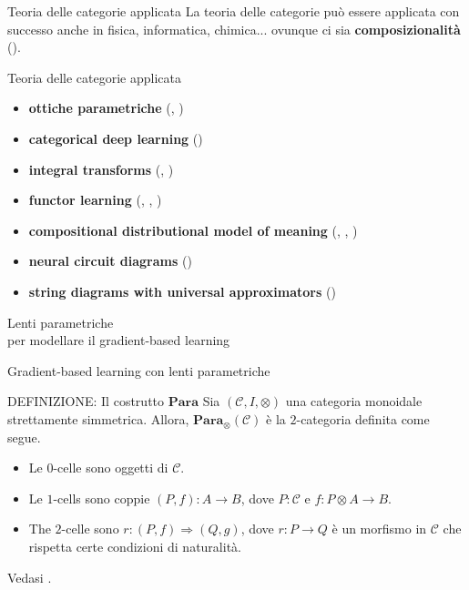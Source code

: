 \documentclass{beamer}
\begin{document}
\begin{frame}{Teoria delle categorie applicata}
    \centering La teoria delle categorie può essere applicata con successo anche in fisica, informatica, chimica... ovunque ci sia \textbf{composizionalità} (\cite{fong2018seven}).
\end{frame}

\begin{frame}{Teoria delle categorie applicata}
    \begin{itemize}
        \item<1-> \textbf{ottiche parametriche} {\footnotesize (\cite{gavranovic2024fundamental}, \cite{cruttwell2022categorical})}
        \item<2-> \textbf{categorical deep learning} {\footnotesize(\cite{gavranovicposition})}
        \item<3-> \textbf{integral transforms} {\footnotesize(\cite{dudzik2022graph}, \cite{dudzik2024asynchronous})}
        \item<4-> \textbf{functor learning} {\footnotesize(\cite{gavranovic2019compositional}, \cite{sheshmani2021categorical}, \cite{chytas2024poolingimagedatasetsmultiple})}
        \item<5-> \textbf{compositional distributional model of meaning} {\footnotesize(\cite{clark2007combining}, \cite{coecke2010mathematical}, \cite{lewis2019compositionality})}
        \item<6-> \textbf{neural circuit diagrams} {\footnotesize(\cite{abbott2023robust})}
        \item<7-> \textbf{string diagrams with universal approximators} {\footnotesize(\cite{khatri2024anatomy})}
    \end{itemize}
\end{frame}

\begin{frame}[standout]
    \huge Lenti parametriche \\\large per modellare il gradient-based learning
\end{frame}

\begin{frame}{Gradient-based learning con lenti parametriche}
    \begin{block}{DEFINIZIONE: Il costrutto $\mathbf{Para}$}
        Sia $(\mathcal{C},I,\otimes)$ una categoria monoidale strettamente simmetrica. Allora, $\mathbf{Para}_{\otimes}(\mathcal{C})$ è la $2$-categoria definita come segue.
        \begin{itemize}
          \item Le $0$-celle sono oggetti di $\mathcal{C}$.
          \item Le $1$-cells sono coppie $(P,f): A \to B$, dove $P : \mathcal{C}$ e $f: P \otimes A \to B$.
          \item The $2$-celle sono $r: (P,f) \Rightarrow (Q,g)$, dove $r: P \to Q$ è un morfismo in $\mathcal{C}$ che rispetta certe condizioni di naturalità.
        \end{itemize}
        Vedasi \cite{gavranovic2024fundamental}.
      \end{block}
\end{frame}
\end{document}
